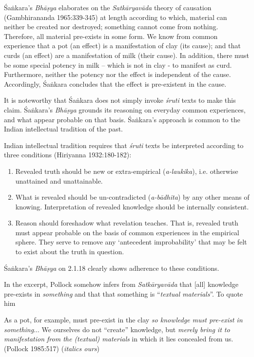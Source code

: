 Śaṅkara's {\sl Bhāṣya} elaborates on the {\sl Satkāryavāda} theory of causation (Gambhirananda 1965:339-345) at length according to which, material can neither be created nor destroyed; something cannot come from nothing. Therefore, all material pre-exists in some form.  We know from common experience that a pot (an effect) is a manifestation of clay (its cause); and that curds (an effect) are a manifestation of milk (their cause). In addition, there must be some special potency in milk -- which is not in clay - to manifest as curd.  Furthermore, neither the potency nor the effect is independent of the cause.  Accordingly, Śaṅkara concludes that the effect is pre-existent in the cause.

It is noteworthy that Śaṅkara does not simply invoke {\sl śruti} texts to make this claim.  Śaṅkara's {\sl Bhāṣya} grounds its reasoning on everyday common experiences, and what appear probable on that basis.  Śaṅkara's approach is common to the Indian intellectual tradition of the past.

\newpage

Indian intellectual tradition requires that {\sl śruti} texts be interpreted according to three conditions (Hiriyanna 1932:180-182):
\begin{enumerate}
\item Revealed truth should be new or extra-empirical ({\sl a-laukika}), i.e. otherwise unattained and unattainable.

\item What is revealed should be un-contradicted ({\sl a-bādhita}) by any other means of knowing. Interpretation of revealed knowledge should be internally consistent.

\item Reason should foreshadow what revelation teaches. That is, revealed truth must appear probable on the basis of common experiences in the empirical sphere. They serve to remove any `antecedent improbability' that may be felt to exist about the truth in question.
\end{enumerate}

Śaṅkara's {\sl Bhāṣya} on 2.1.18 clearly shows adherence to these conditions.

In the excerpt, Pollock somehow infers from {\sl Satkāryavāda} that [all] knowledge pre-exists in {\sl something} and that that something is ``{\sl textual materials}''. To quote him
\begin{myquote}
As a pot, for example, must pre-exist in the clay {\sl so knowledge must pre-exist in something}... We ourselves do not ``create'' knowledge, but {\sl merely bring it to manifestation from the (textual) materials} in which it lies concealed from us.\hfill (Pollock 1985:517) ({\sl italics ours})
\end{myquote}

